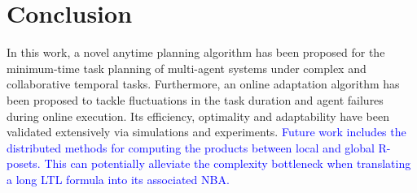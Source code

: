 \section{Conclusion}\label{sec:conclusion}

In this work, a novel anytime planning algorithm has been proposed for
the minimum-time task planning of multi-agent systems
under complex and collaborative temporal tasks.
Furthermore, an online adaptation algorithm has been proposed to tackle
fluctuations in the task duration and agent failures during online execution.
Its efficiency, optimality and adaptability have been validated extensively via
simulations and experiments.
\textcolor{blue}{Future work includes the distributed methods for computing
the products between local and global R-posets.
This can potentially alleviate the complexity bottleneck
when translating a long LTL formula into its associated NBA.}